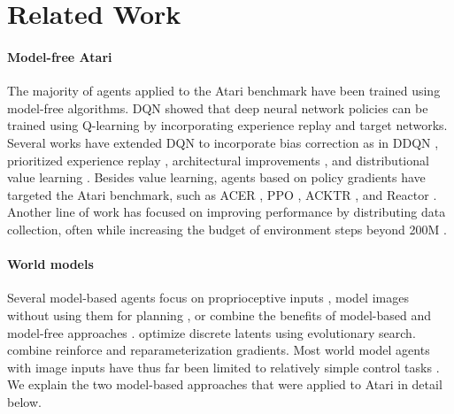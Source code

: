 \section{Related Work}

\paragraph{Model-free Atari}

The majority of agents applied to the Atari benchmark have been trained using model-free algorithms. DQN \citep{mnih2015dqn} showed that deep neural network policies can be trained using Q-learning by incorporating experience replay and target networks. Several works have extended DQN to incorporate bias correction as in DDQN \citep{van2015ddqn}, prioritized experience replay \citep{schaul2015prioritizedreplay}, architectural improvements \citep{wang2016duelingdqn}, and distributional value learning \citep{bellemare2017c51,dabney2017qrdqn,dabney2018iqn}. Besides value learning, agents based on policy gradients have targeted the Atari benchmark, such as ACER \citep{schulman2017ppo}, PPO \citep{schulman2017ppo}, ACKTR \citep{wu2017acktr}, and Reactor \citep{gruslys2017reactor}. Another line of work has focused on improving performance by distributing data collection, often while increasing the budget of environment steps beyond 200M \citep{mnih2016a3c,schulman2017proximal,horgan2018apex,kapturowski2018r2d2,badia2020agent57}.

\paragraph{World models}

Several model-based agents focus on proprioceptive inputs \citep{watter2015e2c,gal2016deeppilco,higuera2018synthesizing,henaff2018planbybackprop,chua2018pets,tingwu2019benchmark,wang2019poplin}, model images without using them for planning \citep{oh2015atari,krishnan2015deepkalman,karl2016dvbf,chiappa2017recenvsim,babaeizadeh2017sv2p,gemici2017temporalmemory,denton2018stochastic,buesing2018dssm,doerr2018prssm,gregor2018tdvae}, or combine the benefits of model-based and model-free approaches \citep{kalweit2017blending,nagabandi2017mbmf,weber2017i2a,kurutach2018modeltrpo,buckman2018steve,ha2018worldmodels,wayne2018merlin,igl2018dvrl,srinivas2018upn,lee2019slac}. \citet{risi2019discrete} optimize discrete latents using evolutionary search. \citet{parmas2019pipps} combine reinforce and reparameterization gradients. Most world model agents with image inputs have thus far been limited to relatively simple control tasks \citep{watter2015e2c,ebert2017visualmpc,ha2018worldmodels,hafner2018planet,zhang2018solar,hafner2019dreamer}. We explain the two model-based approaches that were applied to Atari in detail below.


